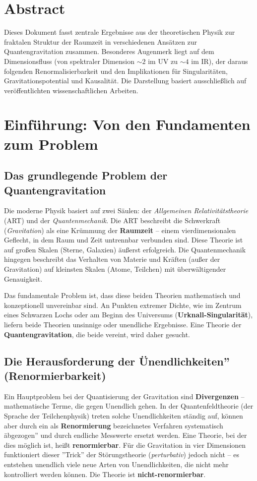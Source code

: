 \section*{Abstract}
		Dieses Dokument fasst zentrale Ergebnisse aus der theoretischen Physik zur fraktalen Struktur der Raumzeit in verschiedenen Ansätzen zur Quantengravitation zusammen. Besonderes Augenmerk liegt auf dem Dimensionsfluss (von spektraler Dimension $\sim 2$ im UV zu $\sim 4$ im IR), der daraus folgenden Renormalisierbarkeit und den Implikationen für Singularitäten, Gravitationspotential und Kausalität. Die Darstellung basiert ausschließlich auf veröffentlichten wissenschaftlichen Arbeiten.

	
	\section{Einführung: Von den Fundamenten zum Problem}
	\subsection{Das grundlegende Problem der Quantengravitation}
	Die moderne Physik basiert auf zwei Säulen: der \emph{Allgemeinen Relativitätstheorie} (ART) und der \emph{Quantenmechanik}. Die ART beschreibt die Schwerkraft (\emph{Gravitation}) als eine Krümmung der \textbf{Raumzeit} – einem vierdimensionalen Geflecht, in dem Raum und Zeit untrennbar verbunden sind. Diese Theorie ist auf großen Skalen (Sterne, Galaxien) äußerst erfolgreich. Die Quantenmechanik hingegen beschreibt das Verhalten von Materie und Kräften (außer der Gravitation) auf kleinsten Skalen (Atome, Teilchen) mit überwältigender Genauigkeit.
	
	Das fundamentale Problem ist, dass diese beiden Theorien mathematisch und konzeptionell unvereinbar sind. An Punkten extremer Dichte, wie im Zentrum eines Schwarzen Lochs oder am Beginn des Universums (\textbf{Urknall-Singularität}), liefern beide Theorien unsinnige oder unendliche Ergebnisse. Eine Theorie der \textbf{Quantengravitation}, die beide vereint, wird daher gesucht.
	
	\subsection{Die Herausforderung der Ünendlichkeiten'' (Renormierbarkeit)}
	Ein Hauptproblem bei der Quantisierung der Gravitation sind \textbf{Divergenzen} – mathematische Terme, die gegen Unendlich gehen. In der Quantenfeldtheorie (der Sprache der Teilchenphysik) treten solche Unendlichkeiten ständig auf, können aber durch ein als \textbf{Renormierung} bezeichnetes Verfahren systematisch äbgezogen'' und durch endliche Messwerte ersetzt werden. Eine Theorie, bei der dies möglich ist, heißt \textbf{renormierbar}. Für die Gravitation in vier Dimensionen funktioniert dieser ''Trick'' der Störungstheorie (\emph{perturbativ}) jedoch nicht – es entstehen unendlich viele neue Arten von Unendlichkeiten, die nicht mehr kontrolliert werden können. Die Theorie ist \textbf{nicht-renormierbar}.
	
